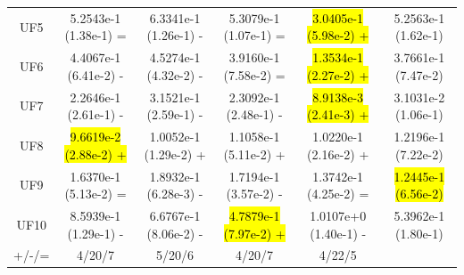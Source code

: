 \documentclass[journal]{IEEEtran}
\begin{document}
\begin{table}[tbp]
\begin{tabular}{cccccc}
    UF5     & 5.2543e-1 (1.38e-1) =      & 6.3341e-1 (1.26e-1) -      & 5.3079e-1 (1.07e-1) =      & \hl{3.0405e-1 (5.98e-2) +} & 5.2563e-1 (1.62e-1)      \\
    UF6     & 4.4067e-1 (6.41e-2) -      & 4.5274e-1 (4.32e-2) -      & 3.9160e-1 (7.58e-2) =      & \hl{1.3534e-1 (2.27e-2) +} & 3.7661e-1 (7.47e-2)      \\
    UF7     & 2.2646e-1 (2.61e-1) -      & 3.1521e-1 (2.59e-1) -      & 2.3092e-1 (2.48e-1) -      & \hl{8.9138e-3 (2.41e-3) +} & 3.1031e-2 (1.06e-1)      \\
    UF8     & \hl{9.6619e-2 (2.88e-2) +} & 1.0052e-1 (1.29e-2) +      & 1.1058e-1 (5.11e-2) +      & 1.0220e-1 (2.16e-2) +      & 1.2196e-1 (7.22e-2)      \\
    UF9     & 1.6370e-1 (5.13e-2) =      & 1.8932e-1 (6.28e-3) -      & 1.7194e-1 (3.57e-2) -      & 1.3742e-1 (4.25e-2) =      & \hl{1.2445e-1 (6.56e-2)} \\
    UF10    & 8.5939e-1 (1.29e-1) -      & 6.6767e-1 (8.06e-2) -      & \hl{4.7879e-1 (7.97e-2) +} & 1.0107e+0 (1.40e-1) -      & 5.3962e-1 (1.80e-1)      \\
    \hline
    +/-/=   & 4/20/7                     & 5/20/6                     & 4/20/7                     & 4/22/5                     &                          \\
    \bottomrule
  \end{tabular}
  \label{tab:igd_all}
\end{table}
\end{document}
